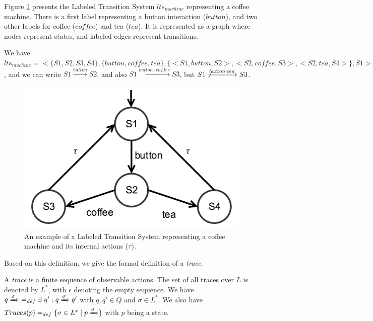 \begin{example}
    Figure \ref{fig:lts-example} presents the Labeled Transition
    System $lts_{machine}$ representing a coffee machine. There
    is a first label representing a button interaction
    ($button$), and two other labels for coffee ($coffee$) and
    tea ($tea$). It is represented as a graph where nodes
    represent states, and labeled edges represent transitions.

    We have $lts_{machine} = <\{ S1, S2, S3, S4 \}, \{ button, coffee, tea
    \}, \{ <S1, button, S2>, <S2, coffee, S3>, <S2, tea, S4> \},
    S1>$, and we can write $S1 \xrightarrow[]{button} S2$, and
    also $S1 \xrightarrow[]{button \cdot coffee} S3$, but $S1
    \not\xrightarrow[]{button \cdot tea} S3$.

    \begin{figure}[ht]
        \begin{center}
            \includegraphics[width=0.6\linewidth]{figures/lts.png}
        \end{center}

        \caption{An example of a Labeled Transition System
        representing a coffee machine and its internal actions
        ($\tau$).}
        \label{fig:lts-example}
    \end{figure}
\end{example}

Based on this definition, we give the formal definition of a
\emph{trace}:

\begin{definition}[Trace]
    A \emph{trace} is a finite sequence of observable actions.
    The set of all traces over $L$ is denoted by $L^*$, with
    $\epsilon$ denoting the empty sequence.
    We have $q \xRightarrow{\sigma} ~=_{def} \exists ~q' : q
    \xRightarrow{\sigma} q'$ with $q, q' \in Q$ and $\sigma \in
    L^*$.
    We also have $Traces(p) =_{def} \{ \sigma \in L^* \mid p
    \xRightarrow{\sigma} \}$ with $p$ being a state.
\end{definition}

